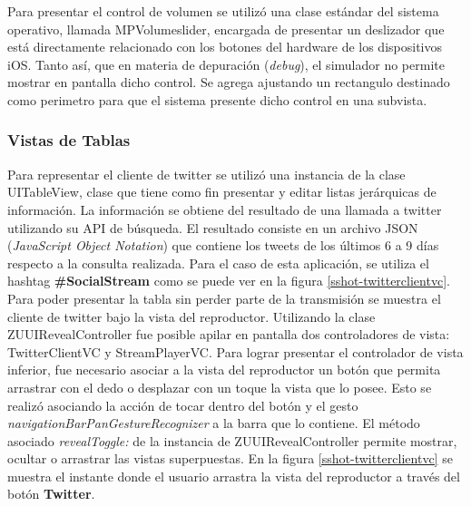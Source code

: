 		Para presentar el control de volumen se utilizó una clase estándar del sistema operativo, llamada MPVolumeslider, encargada de presentar un deslizador que está directamente relacionado con los botones del hardware de los dispositivos iOS. Tanto así, que en materia de depuración (\textit{debug}), el simulador no permite mostrar en pantalla dicho control. Se agrega ajustando un rectangulo destinado como perimetro para que el sistema presente dicho control en una subvista.
		
		\subsubsection{Vistas de Tablas}
Para representar el cliente de twitter se utilizó una instancia de la clase UITableView, clase que tiene como fin presentar y editar listas jerárquicas de información. La información se obtiene del resultado de una llamada a twitter utilizando su API de búsqueda. El resultado consiste en un archivo JSON (\textit{JavaScript Object Notation}) que contiene los tweets de los últimos 6 a 9 días respecto a la consulta realizada. Para el caso de esta aplicación, se utiliza el hashtag \textbf{\#SocialStream} como se puede ver en la figura \ref{sshot-twitterclientvc}.\\

Para poder presentar la tabla sin perder parte de la transmisión se muestra el cliente de twitter bajo la vista del reproductor. Utilizando la clase ZUUIRevealController fue posible apilar en pantalla dos controladores de vista: TwitterClientVC y StreamPlayerVC. Para lograr presentar el controlador de vista inferior, fue necesario asociar a la vista del reproductor un botón que permita arrastrar con el dedo o desplazar con un toque la vista que lo posee. Esto se realizó asociando la acción de tocar dentro del botón y el gesto \textit{navigationBarPanGestureRecognizer} a la barra que lo contiene. El método asociado \textit{revealToggle:} de la instancia de ZUUIRevealController permite mostrar, ocultar o arrastrar las vistas superpuestas. En la figura \ref{sshot-twitterclientvc} se muestra el instante donde el usuario arrastra la vista del reproductor a través del botón \textbf{Twitter}.


